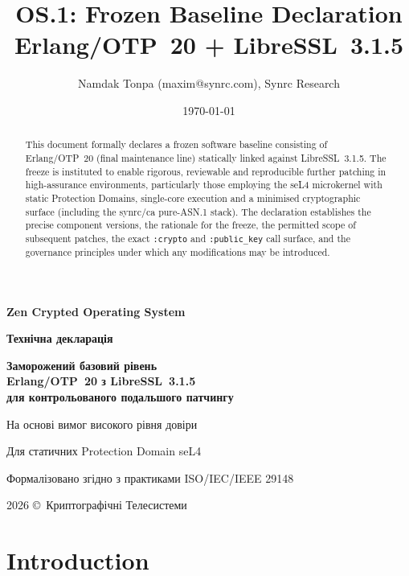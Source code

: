 \documentclass{article}
\title{\textbf{OS.1}: Frozen Baseline Declaration \\ Erlang/OTP~20 + LibreSSL~3.1.5}
\author{Namdak Tonpa (maxim@synrc.com), Synrc Research}
\date{\today}
\newcommand\HUGE[1]{\fontsize{40}{40}\selectfont #1}
\begin{document}
\begin{titlepage}
  \AddToShipoutPictureBG*{\AtPageLowerLeft{\color{nato}\rule{\paperwidth}{\paperheight}}}
  \color{white}\thispagestyle{empty}\vspace*{3cm}\centering
  {\Huge \textbf{Zen Crypted Operating System} \par} \vspace{1.5cm}
  {\HUGE \textbf{Технічна декларація} \par} \vspace{1.5cm}
  {\LARGE \textbf{Заморожений базовий рівень \\ Erlang/OTP~20 з LibreSSL~3.1.5 \\ для контрольованого подальшого патчингу} \par} \vspace{1.5cm}
  {\large На основі вимог високого рівня довіри \par}
  {\large Для статичних Protection Domain seL4 \par}
  {\large Формалізовано згідно з практиками ISO/IEC/IEEE 29148 \par} \vfill
  {\large 2026 \copyright\ Криптографічні Телесистеми \par}
\end{titlepage}

\maketitle

\begin{abstract}
This document formally declares a frozen software baseline consisting of Erlang/OTP~20
(final maintenance line) statically linked against LibreSSL~3.1.5. The freeze is instituted
to enable rigorous, reviewable and reproducible further patching in high-assurance environments,
particularly those employing the seL4 microkernel with static Protection Domains, single-core
execution and a minimised cryptographic surface (including the synrc/ca pure-ASN.1 stack).
The declaration establishes the precise component versions, the rationale for the freeze,
the permitted scope of subsequent patches, the exact \texttt{:crypto} and \texttt{:public\_key}
call surface, and the governance principles under which any modifications may be introduced.
\end{abstract}

\tableofcontents

\newpage
\section{Introduction}
\label{sec:intro}
\end{document}
